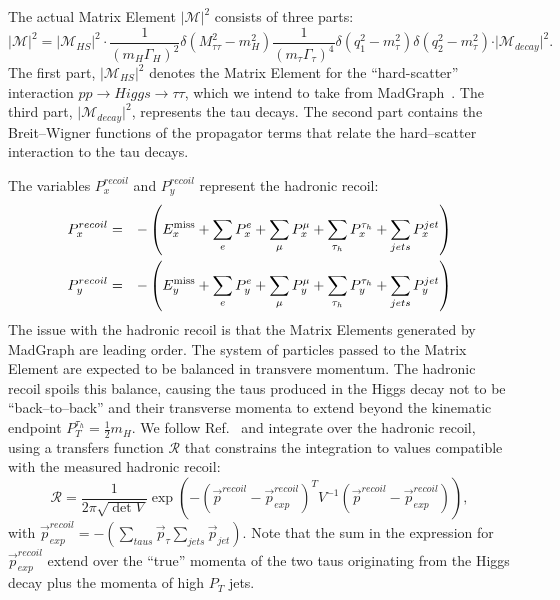 The actual Matrix Element $\vert \mathcal{M} \vert^2$ consists of three parts:
\begin{equation*}
\vert \mathcal{M} \vert^2 = \vert \mathcal{M}_{HS} \vert^2 \cdot \frac{1}{(m_{H}\Gamma_{H})^{2}} \delta(M_{\tau\tau}^2 - m_{H}^2) 
\frac{1}{(m_{\tau}\Gamma_{\tau})^{4}} \delta(q_{1}^2 - m_{\tau}^2) \delta(q_{2}^2 - m_{\tau}^2) \cdot \vert \mathcal{M}_{decay} \vert^2.
\end{equation*}
The first part, $\vert \mathcal{M}_{HS} \vert^2$ denotes the Matrix Element for the ``hard-scatter'' interaction $pp \rightarrow Higgs \rightarrow \tau\tau$, 
which we intend to take from MadGraph~\cite{MadGraph}.
The third part, $\vert \mathcal{M}_{decay} \vert^2$, represents the tau decays.
The second part contains the Breit--Wigner functions of the propagator terms that relate the hard--scatter interaction to the tau decays.

The variables $P_{x}^{recoil}$ and $P_{y}^{recoil}$ represent the hadronic recoil:
\begin{eqnarray*}
P_{x}^{recoil} & = & -\left(E^{\mathrm{miss}}_{x} + \sum_{e} P_{x}^{e} + \sum_{\mu} P_{x}^{\mu} + \sum_{\tau_{h}} P_{x}^{\tau_{h}} + \sum_{jets} P_{x}^{jet} \right) \\
P_{y}^{recoil} & = & -\left(E^{\mathrm{miss}}_{y} + \sum_{e} P_{y}^{e} + \sum_{\mu} P_{y}^{\mu} + \sum_{\tau_{h}} P_{y}^{\tau_{h}} + \sum_{jets} P_{y}^{jet} \right) 
\end{eqnarray*}
The issue with the hadronic recoil is that the Matrix Elements generated by MadGraph are leading order.
The system of particles passed to the Matrix Element are expected to be balanced in transvere momentum.
The hadronic recoil spoils this balance, causing the taus produced in the Higgs decay not to be ``back--to--back'' 
and their transverse momenta to extend beyond the kinematic endpoint $P_{T}^{\tau_{h}} = \frac{1}{2} m_{H}$.
We follow Ref.~\cite{Alwall:2010cq} and integrate over the hadronic recoil, using a transfers function $\mathcal{R}$ that constrains the
integration to values compatible with the measured hadronic recoil:
\begin{equation*}
\mathcal{R} = \frac{1}{2\pi \sqrt{\det V}} \exp \left( - \left( \vec{p}^{recoil} - \vec{p}_{exp}^{recoil} \right)^{T} V^{-1} \left( \vec{p}^{recoil} - \vec{p}_{exp}^{recoil} \right) \right),
\end{equation*}
with $\vec{p}_{exp}^{recoil} = -\left( \sum_{taus} \vec{p}_{\tau} \sum_{jets} \vec{p}_{jet} \right)$.
Note that the sum in the expression for $\vec{p}_{exp}^{recoil}$ extend over the ``true'' momenta of the two taus originating from the Higgs decay plus the momenta of high $P_{T}$ jets.

